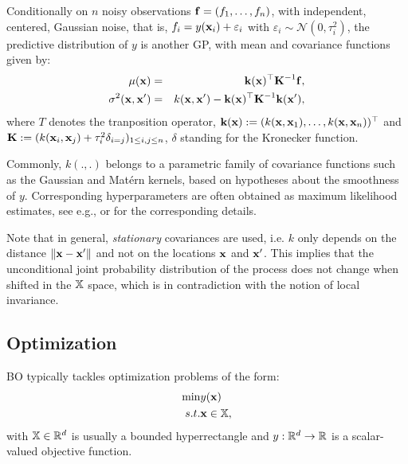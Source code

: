 Conditionally on $n$ noisy observations $\mathbf{f} = (f_1, \ldots, f_n)$, with independent, centered, Gaussian noise,
that is, $f_i = y(\mathbf{x}_i) + \varepsilon_i$ with $\varepsilon_i \sim \mathcal{N}(0, \tau_i^2)$,
the predictive distribution of $y$ is another GP, with mean and covariance functions given by:
\begin{eqnarray}
\mu(\mathbf{x}) & =& \textbf{k}(\mathbf{x})^\top \textbf{K}^{-1} \mathbf{f},  \\
\sigma^2(\mathbf{x}, \mathbf{x}') & =& k(\mathbf{x}, \mathbf{x}') - \textbf{k}(\mathbf{x})^\top \textbf{K}^{-1} \textbf{k}(\mathbf{x}'),
\end{eqnarray}
where $T$ denotes the tranposition operator, $\textbf{k}(\mathbf{x}) := (k(\mathbf{x}, \mathbf{x}_1), \dots, k(\mathbf{x}, \mathbf{x}_n))^\top$ and $\textbf{K} := (k(\mathbf{x}_i, \mathbf{x}_j) + \tau_i^2 \delta_{i=j})_{1 \leq i,j \leq n}$,
$\delta$ standing for the Kronecker function.

Commonly, $k(.,.)$ belongs to a parametric family of covariance functions such as the Gaussian and Mat\'ern kernels, 
based on hypotheses about the smoothness of $y$. Corresponding hyperparameters are often obtained as maximum likelihood estimates, 
see e.g., \citet{Rasmussen2006} or \citet{Roustant2012} for the corresponding details. 

Note that in general, \textit{stationary} covariances are used, 
i.e. $k$ only depends on the distance $\| \mathbf{x} - \mathbf{x}' \|$ and not on the locations $\mathbf{x}$ and $\mathbf{x}'$. 
This implies that the unconditional joint probability distribution of the process does not change when shifted in the $\mathbb{X}$ space,
which is in contradiction with the notion of local invariance.

\subsection{Optimization}

BO typically tackles optimization problems of the form:
\begin{eqnarray*}
 \min & y(\mathbf{x}) \\
 s.t. & \mathbf{x} \in \mathbb{X},
\end{eqnarray*}
with $\mathbb{X} \in \mathbb{R}^d$ is usually a bounded hyperrectangle and $y:\mathbb{R}^d \rightarrow \mathbb{R}$ is a scalar-valued objective function.

